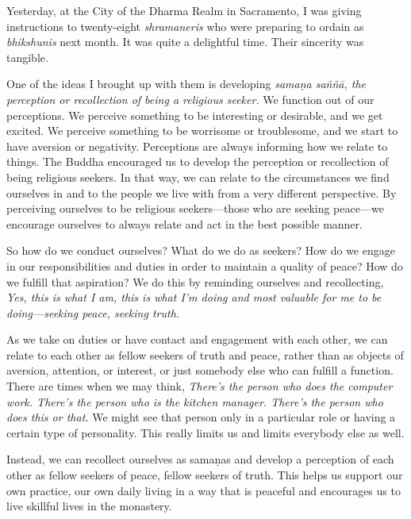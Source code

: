 
Yesterday, at the City of the Dharma Realm in Sacramento, I was giving 
instructions to twenty-eight \emph{shramaneris} who were preparing to 
ordain as \emph{bhikshunis} next month. It was quite a delightful time. 
Their sincerity was tangible.

One of the ideas I brought up with them is developing \emph{samaṇa 
saññā, the perception or recollection of being a religious seeker.} 
We function out of our perceptions. We perceive something to be 
interesting or desirable, and we get excited. We perceive something to 
be worrisome or troublesome, and we start to have aversion or 
negativity. Perceptions are always informing how we relate to things. 
The Buddha encouraged us to develop the perception or recollection of 
being religious seekers. In that way, we can relate to the 
circumstances we find ourselves in and to the people we live with from 
a very different perspective. By perceiving ourselves to be religious 
seekers---those who are seeking peace---we encourage ourselves to 
always relate and act in the best possible manner.

So how do we conduct ourselves? What do we do as seekers? How do we 
engage in our responsibilities and duties in order to maintain a 
quality of peace? How do we fulfill that aspiration? We do this by 
reminding ourselves and recollecting, \emph{Yes, this is what I am, 
this is what I'm doing and most valuable for me to be doing---seeking 
peace, seeking truth.}

As we take on duties or have contact and engagement with each other, we 
can relate to each other as fellow seekers of truth and peace, rather 
than as objects of aversion, attention, or interest, or just somebody 
else who can fulfill a function. There are times when we may think, 
\emph{There's the person who does the computer work. There's the person 
who is the kitchen manager. There's the person who does this or that.} 
We might see that person only in a particular role or having a certain 
type of personality. This really limits us and limits everybody else as 
well.

Instead, we can recollect ourselves as samaṇas and develop a 
perception of each other as fellow seekers of peace, fellow seekers of 
truth. This helps us support our own practice, our own daily living in 
a way that is peaceful and encourages us to live skillful lives in the 
monastery.


